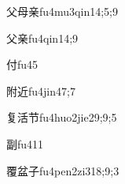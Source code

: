 \begin{verbete}{父母亲}{fu4mu3qin1}{4;5;9}
\end{verbete}

\begin{verbete}{父亲}{fu4qin1}{4;9}
\end{verbete}

\begin{verbete}{付}{fu4}{5}
\end{verbete}

\begin{verbete}{附近}{fu4jin4}{7;7}
\end{verbete}

\begin{verbete}{复活节}{fu4huo2jie2}{9;9;5}
\end{verbete}

\begin{verbete}{副}{fu4}{11}
\end{verbete}

\begin{verbete}{覆盆子}{fu4pen2zi3}{18;9;3}
\end{verbete}

